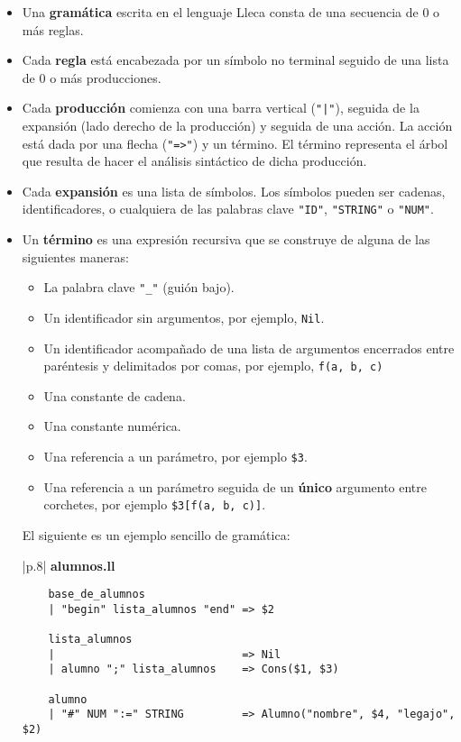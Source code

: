 \documentclass{article}
\newcommand{\lleca}{\textsf{Lleca}\xspace}
\begin{document}
\begin{itemize}
\item
  Una {\bf gram\'atica} escrita en el lenguaje \lleca consta de una secuencia
  de $0$ o m\'as reglas. 
\item
  Cada {\bf regla} est\'a encabezada por un s\'imbolo no terminal
  seguido de una lista de $0$ o m\'as producciones.
\item
  Cada {\bf producci\'on}
  comienza con una barra vertical (\verb`"|"`),
  seguida de la expansi\'on (lado derecho de la producci\'on)
  y seguida de una acci\'on.
  La acci\'on est\'a dada por una flecha (\verb`"=>"`)
  y un t\'ermino. El t\'ermino representa el \'arbol
  que resulta de hacer el an\'alisis sint\'actico de dicha producci\'on.
\item
  Cada {\bf expansi\'on} es una lista de s\'imbolos.
  Los s\'imbolos pueden ser
  cadenas, identificadores, o cualquiera de las palabras
  clave \verb|"ID"|, \verb|"STRING"| o \verb|"NUM"|.
\item
  Un {\bf t\'ermino} es una expresi\'on recursiva que se construye
  de alguna de las siguientes maneras:
  \begin{itemize}
  \item La palabra clave \verb|"_"| (gui\'on bajo).
  \item Un identificador sin argumentos, por ejemplo, \texttt{Nil}.
  \item Un identificador acompa\~nado de una lista de
        argumentos encerrados entre par\'entesis y delimitados por comas,
        por ejemplo, \texttt{f(a, b, c)}
  \item Una constante de cadena.
  \item Una constante num\'erica.
  \item Una referencia a un par\'ametro, por ejemplo \verb|$3|.
  \item Una referencia a un par\'ametro seguida de un
        {\bf \'unico} argumento entre corchetes,
        por ejemplo \verb|$3[f(a, b, c)]|.
  \end{itemize}

  El siguiente es un ejemplo sencillo de gram\'atica:
  \begin{center}
  \begin{tabular}{|p{}|}
 \hline
  {\bf alumnos.ll}
  \\
  \hline
  \begin{verbatim}
    base_de_alumnos
    | "begin" lista_alumnos "end" => $2

    lista_alumnos
    |                             => Nil
    | alumno ";" lista_alumnos    => Cons($1, $3)

    alumno
    | "#" NUM ":=" STRING         => Alumno("nombre", $4, "legajo", $2)
  \end{verbatim}
  \\
  \hline
  \end{tabular}
  \end{center}

\end{itemize}
\end{document}
